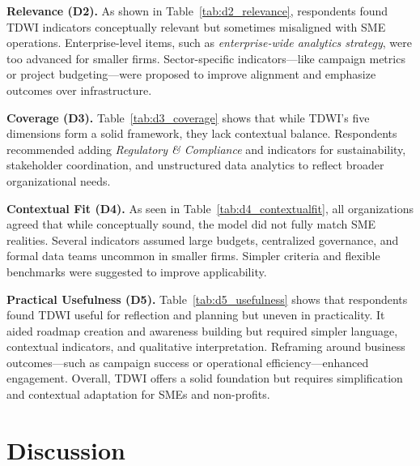 \documentclass[conference]{IEEEtran}
\begin{document}
\textbf{Relevance (D2).}  
As shown in Table~\ref{tab:d2_relevance}, respondents found TDWI indicators conceptually relevant but sometimes misaligned with SME operations.  
Enterprise-level items, such as \emph{enterprise-wide analytics strategy}, were too advanced for smaller firms.  
Sector-specific indicators---like campaign metrics or project budgeting---were proposed to improve alignment and emphasize outcomes over infrastructure.

\textbf{Coverage (D3).}  
Table~\ref{tab:d3_coverage} shows that while TDWI’s five dimensions form a solid framework, they lack contextual balance.  
Respondents recommended adding \textit{Regulatory \& Compliance} and indicators for sustainability, stakeholder coordination, and unstructured data analytics to reflect broader organizational needs.

\textbf{Contextual Fit (D4).}  
As seen in Table~\ref{tab:d4_contextualfit}, all organizations agreed that while conceptually sound, the model did not fully match SME realities.  
Several indicators assumed large budgets, centralized governance, and formal data teams uncommon in smaller firms.  
Simpler criteria and flexible benchmarks were suggested to improve applicability.

\textbf{Practical Usefulness (D5).}  
Table~\ref{tab:d5_usefulness} shows that respondents found TDWI useful for reflection and planning but uneven in practicality.  
It aided roadmap creation and awareness building but required simpler language, contextual indicators, and qualitative interpretation.  
Reframing around business outcomes---such as campaign success or operational efficiency---enhanced engagement.  
Overall, TDWI offers a solid foundation but requires simplification and contextual adaptation for SMEs and non-profits.


\section{Discussion}
\label{sec:discussion}
\end{document}
